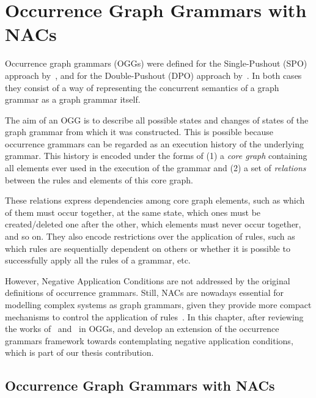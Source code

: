 \chapter{Occurrence Graph Grammars with NACs}\label{ch:process}

Occurrence graph grammars (OGGs) were defined for the Single-Pushout (SPO) approach by~\cite{Ribeiro1996}, and for the Double-Pushout (DPO) approach by~\cite{Corradini1996}. In both cases they consist of a way of representing the concurrent semantics of a graph grammar as a graph grammar itself.

The aim of an OGG is to describe all possible states and changes of states of the graph grammar from which it was constructed. This is possible because occurrence grammars can be regarded as an execution history of the underlying grammar. This history is encoded under the forms of (1) a \emph{core graph} containing all elements ever used in the execution of the grammar and (2) a set of \emph{relations} between the rules and elements of this core graph. 

These relations express dependencies among core graph elements, such as which of them must occur together, at the same state, which ones must be created/deleted one after the other, which elements must never occur together, and so on. They also encode restrictions over the application of rules, such as which rules are sequentially dependent on others or whether it is possible to successfully apply all the rules of a grammar, etc. %

However, Negative Application Conditions are not addressed by the original definitions of occurrence grammars. Still, NACs are nowadays essential for modelling complex systems as graph grammars, given they provide more compact mechanisms to control the application of rules~\cite{Habel1996, Lambers2008, Corradini2014}. In this chapter, after reviewing the works of~\cite{Ribeiro1996} and~\cite{Corradini1996} in OGGs, and develop an extension of the occurrence grammars framework towards contemplating negative application conditions, which is part of our thesis contribution.

\section{Occurrence Graph Grammars with NACs}

